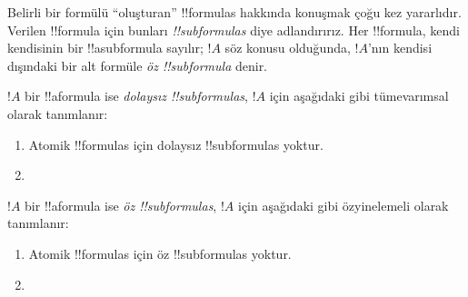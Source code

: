 \documentclass[../../../include/open-logic-section]{subfiles}
\begin{document}


\begin{explain}
Belirli bir formülü ``oluşturan'' !!{formula}s hakkında konuşmak çoğu
kez yararlıdır. Verilen !!{formula} için bunları
\emph{!!{subformula}s} diye adlandırırız. Her !!{formula}, kendi kendisinin bir
!!a{subformula} sayılır; $!A$ söz konusu olduğunda, $!A$'nın kendisi dışındaki bir alt formüle
\emph{öz !!{subformula}} denir.
\end{explain}

\begin{defn}
$!A$ bir !!a{formula} ise \emph{dolaysız !!{subformula}s}, $!A$ için
aşağıdaki gibi tümevarımsal olarak tanımlanır:
\begin{enumerate}
\item Atomik !!{formula}s için dolaysız !!{subformula}s yoktur.


\item {}


\end{enumerate}
\end{defn}

\begin{defn}[Öz !!^{subformula}]
$!A$ bir !!a{formula} ise \emph{öz !!{subformula}s}, $!A$ için
aşağıdaki gibi özyinelemeli olarak tanımlanır:
\begin{enumerate}
\item Atomik !!{formula}s için öz !!{subformula}s yoktur.


\item {}


\end{enumerate}
\end{defn}
\end{document}
